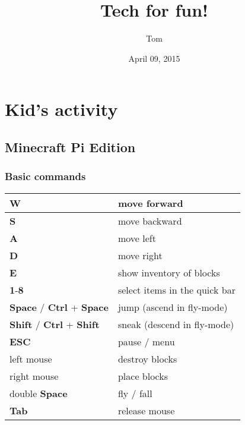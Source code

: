 \documentclass[letterpaper,10pt,english]{sphinxmanual}
\title{Tech for fun!}
\date{April 09, 2015}
\author{Tom}
\begin{document}
\maketitle
\tableofcontents
{}\label{index::doc}



\chapter{Kid's activity}
\label{index:kid-s-activity}\label{index:tech-for-fun}

\section{Minecraft Pi Edition}
\label{kid/minecraft::doc}\label{kid/minecraft:minecraft-pi-edition}

\subsection{Basic commands}
\label{kid/minecraft:basic-commands}
\begin{tabulary}{\linewidth}{|L|L|}
\hline

\textbf{W}
 & 
move forward
\\
\hline
\textbf{S}
 & 
move backward
\\
\hline
\textbf{A}
 & 
move left
\\
\hline
\textbf{D}
 & 
move right
\\
\hline
\textbf{E}
 & 
show inventory of blocks
\\
\hline
\textbf{1}-\textbf{8}
 & 
select items in the quick bar
\\
\hline
\textbf{Space} / \textbf{Ctrl} + \textbf{Space}
 & 
jump (ascend in fly-mode)
\\
\hline
\textbf{Shift} / \textbf{Ctrl} + \textbf{Shift}
 & 
sneak (descend in fly-mode)
\\
\hline
\textbf{ESC}
 & 
pause / menu
\\
\hline
left mouse
 & 
destroy blocks
\\
\hline
right mouse
 & 
place blocks
\\
\hline
double \textbf{Space}
 & 
fly / fall
\\
\hline
\textbf{Tab}
 & 
release mouse
\\
\hline\end{tabulary}
\end{document}
